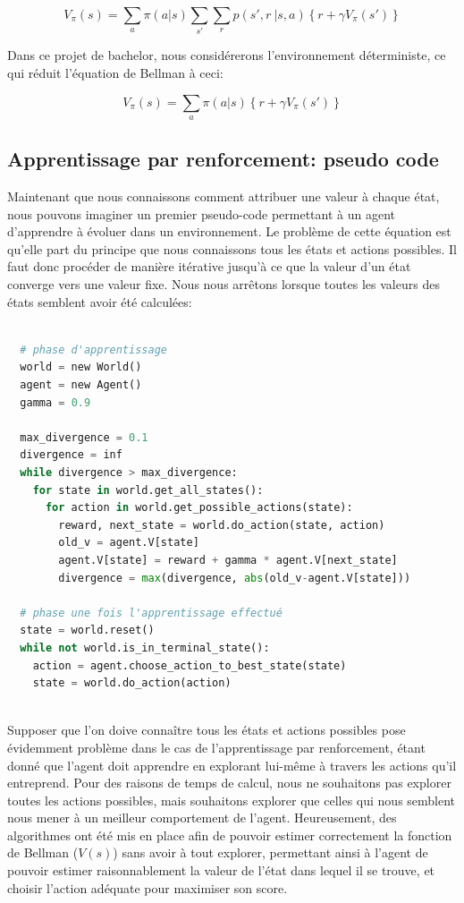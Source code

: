 \documentclass[11pt,a4paper]{report}
\begin{document}
    $$V_\pi(s) = \sum_a\pi(a|s)\sum_{s'}\sum_rp(s',r\ |s,a)\left\{r+\gamma V_\pi(s')\right\}$$
    
    \par Dans ce projet de bachelor, nous considérerons l'environnement déterministe, ce qui réduit l'équation de Bellman à ceci: 
    
    $$V_\pi(s) = \sum_a\pi(a|s)\left\{r+\gamma V_\pi(s')\right\}$$

    
  \subsection{Apprentissage par renforcement: pseudo code}
  
  \par Maintenant que nous connaissons comment attribuer une valeur à chaque état, nous pouvons imaginer un premier pseudo-code permettant à un agent d'apprendre à évoluer dans un environnement. Le problème de cette équation est qu'elle part du principe que nous connaissons tous les états et actions possibles. Il faut donc procéder de manière itérative jusqu'à ce que la valeur d'un état converge vers une valeur fixe. Nous nous arrêtons lorsque toutes les valeurs des états semblent avoir été calculées:  
  
   \begin{lstlisting}[language=python]
 
  # phase d'apprentissage
  world = new World()
  agent = new Agent()
  gamma = 0.9
  
  max_divergence = 0.1
  divergence = inf
  while divergence > max_divergence:
    for state in world.get_all_states():
      for action in world.get_possible_actions(state):
        reward, next_state = world.do_action(state, action)
        old_v = agent.V[state]
        agent.V[state] = reward + gamma * agent.V[next_state]
        divergence = max(divergence, abs(old_v-agent.V[state]))
        
  # phase une fois l'apprentissage effectué
  state = world.reset()
  while not world.is_in_terminal_state():
    action = agent.choose_action_to_best_state(state)
    state = world.do_action(action)
        
   \end{lstlisting}
  
  \par Supposer que l'on doive connaître tous les états et actions possibles pose évidemment problème dans le cas de l'apprentissage par renforcement, étant donné que l'agent doit apprendre en explorant lui-même à travers les actions qu'il entreprend. Pour des raisons de temps de calcul, nous ne souhaitons pas explorer toutes les actions possibles, mais souhaitons explorer que celles qui nous semblent nous mener à un meilleur comportement de l'agent. Heureusement, des algorithmes ont été mis en place afin de pouvoir estimer correctement la fonction de Bellman ($V(s)$) sans avoir à tout explorer, permettant ainsi à l'agent de pouvoir estimer raisonnablement la valeur de l'état dans lequel il se trouve, et choisir l'action adéquate pour maximiser son score. 
    
\end{document}
